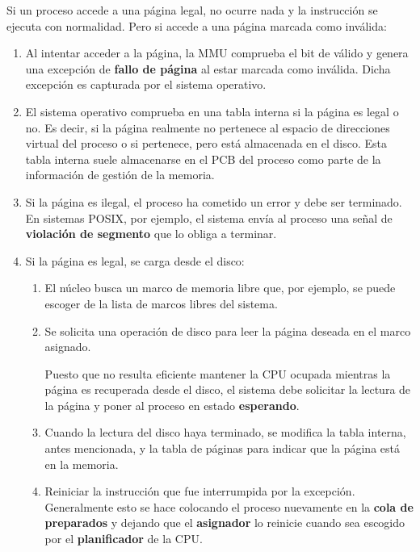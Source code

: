 Si un proceso accede a una página legal, no ocurre nada y la instrucción
se ejecuta con normalidad. Pero si accede a una página marcada como
inválida:

\begin{enumerate}
\def\labelenumi{\arabic{enumi}.}
\item
  Al intentar acceder a la página, la MMU comprueba el bit de válido y
  genera una excepción de \textbf{{}fallo de página} al estar marcada
  como inválida. Dicha excepción es capturada por el sistema operativo.
\item
  El sistema operativo comprueba en una tabla interna si la página es
  legal o no. Es decir, si la página realmente no pertenece al espacio
  de direcciones virtual del proceso o si pertenece, pero está
  almacenada en el disco. Esta tabla interna suele almacenarse en el PCB
  del proceso como parte de la información de gestión de la memoria.
\item
  Si la página es ilegal, el proceso ha cometido un error y debe ser
  terminado. En sistemas POSIX, por ejemplo, el sistema envía al proceso
  una señal de \textbf{violación de segmento} que lo obliga a terminar.
\item
  Si la página es legal, se carga desde el disco:

  \begin{enumerate}
  \def\labelenumii{\alph{enumii}.}
  \item
    El núcleo busca un marco de memoria libre que, por ejemplo, se puede
    escoger de la lista de marcos libres del sistema.
  \item
    Se solicita una operación de disco para leer la página deseada en el
    marco asignado.

    Puesto que no resulta eficiente mantener la CPU ocupada mientras la
    página es recuperada desde el disco, el sistema debe solicitar la
    lectura de la página y poner al proceso en estado
    \textbf{esperando}.
  \item
    Cuando la lectura del disco haya terminado, se modifica la tabla
    interna, antes mencionada, y la tabla de páginas para indicar que la
    página está en la memoria.
  \item
    Reiniciar la instrucción que fue interrumpida por la excepción.
    Generalmente esto se hace colocando el proceso nuevamente en la
    \textbf{cola de preparados} y dejando que el \textbf{asignador} lo
    reinicie cuando sea escogido por el \textbf{planificador} de la CPU.
  \end{enumerate}
\end{enumerate}

